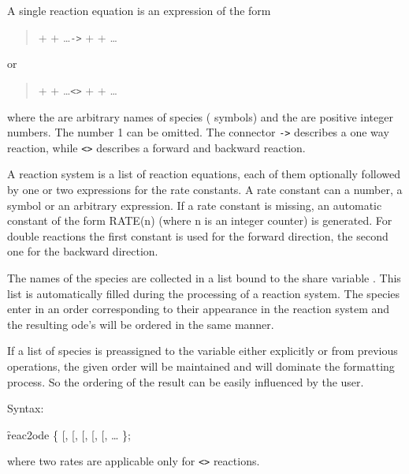 
A single reaction equation is an expression of the form
\begin{quote}
  +  + \ldots \texttt{->}  +  + \ldots
\end{quote}
 or
\begin{quote}  +  + \ldots \texttt{<>}  +  + \ldots
\end{quote}
where the  are arbitrary names of species (\REDUCE{} symbols)
and the  are positive integer numbers. The number 1
can be omitted. The connector \texttt{->} describes a one way reaction,
while \texttt{<>} describes a forward and backward reaction.

A reaction system is a list of reaction equations, each of them
optionally followed by one or two expressions for the rate
constants. A rate constant can a number, a symbol or an 
arbitrary \REDUCE{} expression. If a rate constant is missing,
an automatic constant of the form RATE(n) (where n is an
integer counter) is generated. For double reactions the
first constant is used for the forward direction, the second
one for the backward direction.

The names of the species are collected in a list bound to
the \REDUCE{} share variable .
This list is automatically filled
during the processing of a reaction system. The species enter
in an order corresponding to their appearance in the reaction
system and the resulting ode's will be ordered in the same manner.

If a list of species is preassigned to the variable
 either explicitly or from previous operations, the 
given order will be maintained and will dominate the formatting
process. So the ordering of the result can be easily influenced
by the user.

Syntax:
\begin{syntax}
  \f{reac2ode} \{ {[}, {[},\meta{rate}{]}{]}
  {[}, {[}, {[},\meta{rate}{]}{]}{]}
  \ldots
  \};
\end{syntax}
where two rates are applicable only for \texttt{<>} reactions.

